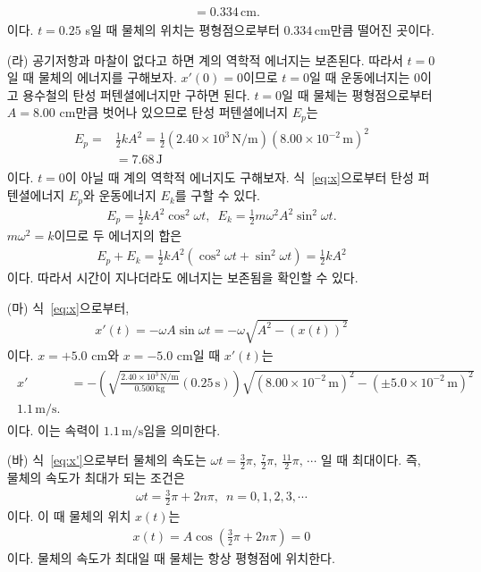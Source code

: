 \documentclass[floatfix,nofootinbib,superscriptaddress,fleqn]{revtex4-2}
\begin{document}
\begin{itemize}
\begin{align}
\begin{split}
        &=0.334\,\mathrm{cm}.
      \end{split}
  \end{align}
  이다. $t=0.25$ s일 때 물체의 위치는 평형점으로부터 $0.334\,\mathrm{cm}$만큼
  떨어진 곳이다.
  \item[(라)]
  공기저항과 마찰이 없다고 하면 계의 역학적 에너지는 보존된다. 따라서 $t=0$일 때 
  물체의 에너지를 구해보자. $x'(0)=0$이므로 $t=0$일 때 운동에너지는 $0$이고 용수철의
  탄성 퍼텐셜에너지만 구하면 된다. $t=0$일 때 물체는 평형점으로부터 $A=8.00$ cm만큼
  벗어나 있으므로 탄성 퍼텐셜에너지 $E_p$는
  \begin{align}
    \begin{split}
      E_p =& \frac{1}{2}kA^2 = \frac{1}{2}
      (2.40\times 10^3\,\mathrm{N/m})
      (8.00\times 10^{-2}\,\mathrm{m})^2  \\
      &= 7.68\,\mathrm{J}
    \end{split}
  \end{align}
  이다. $t=0$이 아닐 때 계의 역학적 에너지도 구해보자. 식~\eqref{eq:x}으로부터
  탄성 퍼텐셜에너지 $E_p$와 운동에너지 $E_k$를 구할 수 있다.
  \begin{align}
    E_p = \frac{1}{2}kA^2\cos^2\omega t,\,\,\,
    E_k = \frac{1}{2}m\omega^2A^2\sin^2\omega t.
  \end{align}
  $m\omega^2=k$이므로 두 에너지의 합은
  \begin{align}
    E_p +  E_k = \frac{1}{2}kA^2(\cos^2\omega t+\sin^2\omega t)
    =\frac{1}{2}kA^2
  \end{align}
  이다. 따라서 시간이 지나더라도 에너지는 보존됨을 확인할 수 있다.
  \item[(마)] 
  식~\eqref{eq:x}으로부터,
  \begin{align}\label{eq:x'}
    x'(t) = -\omega A\sin\omega t = -\omega\sqrt{A^2-(x(t))^2}
  \end{align}
  이다. $x=+5.0$ cm와 $x=-5.0$ cm일 때 $x'(t)$는 
  \begin{align}
    \begin{split}
      x' &= -\left(
        \sqrt{\frac{2.40\times 10^3\,\mathrm{N/m}}{0.500\,\mathrm{kg}}}
        (0.25\,\mathrm{s})\right)
        \sqrt{(8.00\times 10^{-2}\,\mathrm{m})^2
        -(\pm 5.0\times 10^{-2}\,\mathrm{m})^2} \\
      1.1\,\mathrm{m/s}.
    \end{split}
  \end{align}
  이다. 이는 속력이 $1.1\,\mathrm{m/s}$임을 의미한다.
  \item[(바)] 
  식~\eqref{eq:x'}으로부터 물체의 속도는 
  $\omega t = \frac{3}{2}\pi,\,\frac{7}{2}\pi,\,\frac{11}{2}\pi,\,\cdots$
  일 때 최대이다. 즉, 물체의 속도가 최대가 되는 조건은
  \begin{align}
    \omega t = \frac{3}{2}\pi+2n\pi,\,\,\,n=0,1,2,3,\cdots
  \end{align}
  이다. 이 때 물체의 위치 $x(t)$는 
  \begin{align}
    x(t) = A\cos\left(\frac{3}{2}\pi+2n\pi\right) = 0
  \end{align}
  이다. 물체의 속도가 최대일 때 물체는 항상 평형점에 위치한다.
 \end{itemize}
\end{document}
